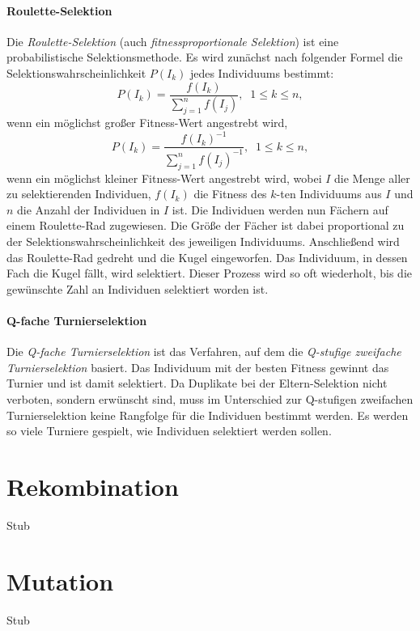 \paragraph{Roulette-Selektion}
Die \textit{Roulette-Selektion} (auch \textit{fitnessproportionale Selektion}) ist eine probabilistische Selektionsmethode. Es wird zunächst nach folgender Formel die Selektionswahrscheinlichkeit $P(I_k)$ jedes Individuums bestimmt: 
\begin{equation}
P(I_k) = \frac{f(I_k)}{\sum\limits_{j=1}^n f(I_j)},\;\;1 \le k \le n,
\end{equation}
wenn ein möglichst großer Fitness-Wert angestrebt wird, 
\begin{equation}
P(I_k) = \frac{f(I_k)^{-1}}{\sum\limits_{j=1}^n f(I_j)^{-1}},\;\;1 \le k \le n,
\end{equation}
wenn ein möglichst kleiner Fitness-Wert angestrebt wird, wobei $I$ die Menge aller zu selektierenden Individuen, $f(I_k)$ die Fitness des $k$-ten Individuums aus $I$ und $n$ die Anzahl der Individuen in $I$ ist. 
Die Individuen werden nun Fächern auf einem Roulette-Rad zugewiesen. Die Größe der Fächer ist dabei proportional zu der Selektionswahrscheinlichkeit des jeweiligen Individuums. Anschließend wird das Roulette-Rad gedreht und die Kugel eingeworfen. Das Individuum, in dessen Fach die Kugel fällt, wird selektiert. Dieser Prozess wird so oft wiederholt, bis die gewünschte Zahl an Individuen selektiert worden ist. 

\paragraph{Q-fache Turnierselektion}
Die \textit{Q-fache Turnierselektion} ist das Verfahren, auf dem die \textit{Q-stufige zweifache Turnierselektion} basiert. Das Individuum mit der besten Fitness gewinnt das Turnier und ist damit selektiert. Da Duplikate bei der Eltern-Selektion nicht verboten, sondern erwünscht sind, muss im Unterschied zur Q-stufigen zweifachen Turnierselektion keine Rangfolge für die Individuen bestimmt werden. Es werden so viele Turniere gespielt, wie Individuen selektiert werden sollen. 

\section{Rekombination}
Stub

\section{Mutation}
Stub

